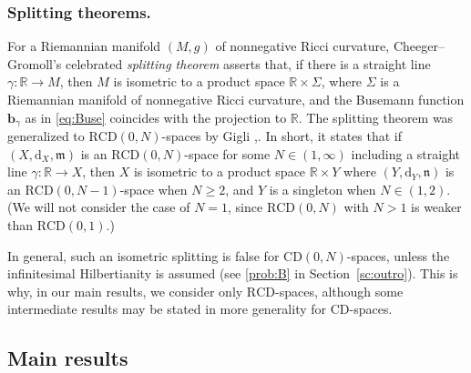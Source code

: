 \documentclass[sts]{imsart}
\theoremstyle{definition}
\theoremstyle{remark}
\newcommand{\R}{\mathbb{R}}
\newcommand{\bb}{\mathbf{b}}
\newcommand{\fm}{\mathfrak{m}}
\newcommand{\fn}{\mathfrak{n}}
\newcommand{\dist}{\mathrm{d}}
\newcommand{\lra}{\longrightarrow}
\newcommand{\CD}{\mathrm{CD}}
\newcommand{\RCD}{\mathrm{RCD}}
\begin{document}
\subsubsection{Splitting theorems.}%

For a Riemannian manifold $(M,g)$ of nonnegative Ricci curvature, Cheeger--Gromoll's celebrated \emph{splitting theorem} \cite{CG} asserts that, if there is a straight line $\gamma\colon \R \lra M$, then $M$ is isometric to a product space $\R \times \Sigma$, where $\Sigma$ is a Riemannian manifold of nonnegative Ricci curvature, and the Busemann function $\bb_\gamma$ as in \eqref{eq:Buse} coincides with the projection to $\R$.
The splitting theorem was generalized to $\RCD(0,N)$-spaces by Gigli \cite[Theorem 1.4]{gsplit},\cite{Greview}.
In short, it states that if $(X,\dist_X,\fm)$ is an $\RCD(0,N)$-space for some $N\in (1,\infty)$ including a straight line $\gamma\colon \R\lra X$, then $X$ is isometric to a product space $\R \times Y$ where $(Y,\dist_Y,\fn)$ is an $\RCD(0,N-1)$-space when $N \ge 2$, and $Y$ is a singleton when $N \in (1,2)$.
(We will not consider the case of $N=1$, since $\RCD(0,N)$ with $N>1$ is weaker than $\RCD(0,1)$.)

In general, such an isometric splitting is false for $\CD(0,N)$-spaces, unless the infinitesimal Hilbertianity is assumed (see \eqref{prob:B} in Section~\ref{sc:outro}).
This is why, in our main results, we consider only $\RCD$-spaces, although some intermediate results may be stated in more generality for $\CD$-spaces.

\subsection{Main results}%
\end{document}
